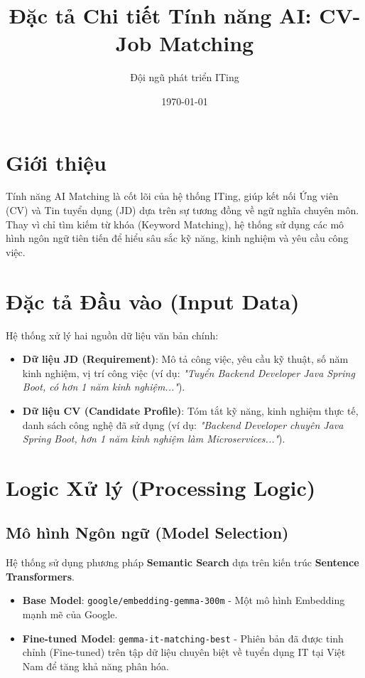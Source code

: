 \documentclass[12pt, a4paper]{article}
\title{\textbf{Đặc tả Chi tiết Tính năng AI: CV-Job Matching}}
\author{Đội ngũ phát triển ITing}
\date{\today}
\begin{document}
\maketitle

\section{Giới thiệu}
Tính năng AI Matching là cốt lõi của hệ thống ITing, giúp kết nối Ứng viên (CV) và Tin tuyển dụng (JD) dựa trên sự tương đồng về ngữ nghĩa chuyên môn. Thay vì chỉ tìm kiếm từ khóa (Keyword Matching), hệ thống sử dụng các mô hình ngôn ngữ tiên tiến để hiểu sâu sắc kỹ năng, kinh nghiệm và yêu cầu công việc.

\section{Đặc tả Đầu vào (Input Data)}
Hệ thống xử lý hai nguồn dữ liệu văn bản chính:
\begin{itemize}
    \item \textbf{Dữ liệu JD (Requirement)}: Mô tả công việc, yêu cầu kỹ thuật, số năm kinh nghiệm, vị trí công việc (ví dụ: \textit{"Tuyển Backend Developer Java Spring Boot, có hơn 1 năm kinh nghiệm..."}).
    \item \textbf{Dữ liệu CV (Candidate Profile)}: Tóm tắt kỹ năng, kinh nghiệm thực tế, danh sách công nghệ đã sử dụng (ví dụ: \textit{"Backend Developer chuyên Java Spring Boot, hơn 1 năm kinh nghiệm làm Microservices..."}).
\end{itemize}

\section{Logic Xử lý (Processing Logic)}

\subsection{Mô hình Ngôn ngữ (Model Selection)}
Hệ thống sử dụng phương pháp \textbf{Semantic Search} dựa trên kiến trúc \textbf{Sentence Transformers}.
\begin{itemize}
    \item \textbf{Base Model}: \texttt{google/embedding-gemma-300m} - Một mô hình Embedding mạnh mẽ của Google.
    \item \textbf{Fine-tuned Model}: \texttt{gemma-it-matching-best} - Phiên bản đã được tinh chỉnh (Fine-tuned) trên tập dữ liệu chuyên biệt về tuyển dụng IT tại Việt Nam để tăng khả năng phân hóa.
\end{itemize}
\end{document}
